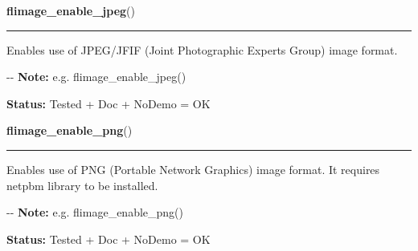     \vspace{0.5ex}

\hspace{.8\funcindent}\begin{boxedminipage}{\funcwidth}

    \raggedright \textbf{flimage\_enable\_jpeg}()

    \vspace{-1.5ex}

    \rule{\textwidth}{0.5\fboxrule}
\setlength{\parskip}{2ex}

Enables use of JPEG/JFIF (Joint Photographic Experts Group) image
format.

-{}-
\setlength{\parskip}{1ex}
\textbf{Note:} 
e.g. flimage\_enable\_jpeg()


\textbf{Status:} 
Tested + Doc + NoDemo = OK


    \end{boxedminipage}

    \label{xformslib:flflimage:flimage_enable_png}

    \vspace{0.5ex}

\hspace{.8\funcindent}\begin{boxedminipage}{\funcwidth}

    \raggedright \textbf{flimage\_enable\_png}()

    \vspace{-1.5ex}

    \rule{\textwidth}{0.5\fboxrule}
\setlength{\parskip}{2ex}

Enables use of PNG (Portable Network Graphics) image format. It
requires netpbm library to be installed.

-{}-
\setlength{\parskip}{1ex}
\textbf{Note:} 
e.g. flimage\_enable\_png()


\textbf{Status:} 
Tested + Doc + NoDemo = OK


    \end{boxedminipage}

    \label{xformslib:flflimage:flimage_enable_ps}

    \vspace{0.5ex}

